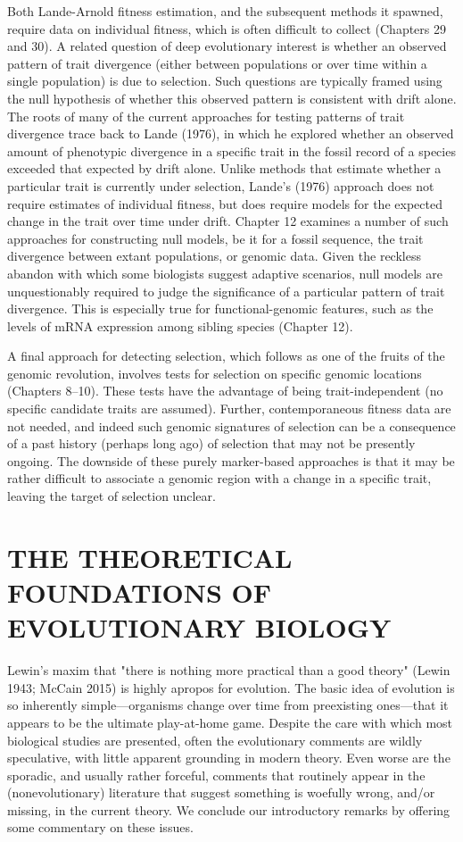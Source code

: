 \documentclass{article}
\begin{document}
Both Lande-Arnold fitness estimation, and the subsequent methods it spawned, require data on individual fitness, which is often difficult to collect (Chapters 29 and 30). A related question of deep evolutionary interest is whether an observed pattern of trait divergence (either between populations or over time within a single population) is due to selection. Such questions are typically framed using the null hypothesis of whether this observed pattern is consistent with drift alone. The roots of many of the current approaches for testing patterns of trait divergence trace back to Lande (1976), in which he explored whether an observed amount of phenotypic divergence in a specific trait in the fossil record of a species exceeded that expected by drift alone. Unlike methods that estimate whether a particular trait is currently under selection, Lande's (1976) approach does not require estimates of individual fitness, but does require models for the expected change in the trait over time under drift. Chapter 12 examines a number of such approaches for constructing null models, be it for a fossil sequence, the trait divergence between extant populations, or genomic data. Given the reckless abandon with which some biologists suggest adaptive scenarios, null models are unquestionably required to judge the significance of a particular pattern of trait divergence. This is especially true for functional-genomic features, such as the levels of mRNA expression among sibling species (Chapter 12).

A final approach for detecting selection, which follows as one of the fruits of the genomic revolution, involves tests for selection on specific genomic locations (Chapters 8–10). These tests have the advantage of being trait-independent (no specific candidate traits are assumed). Further, contemporaneous fitness data are not needed, and indeed such genomic signatures of selection can be a consequence of a past history (perhaps long ago) of selection that may not be presently ongoing. The downside of these purely marker-based approaches is that it may be rather difficult to associate a genomic region with a change in a specific trait, leaving the target of selection unclear.

\section{THE THEORETICAL FOUNDATIONS OF EVOLUTIONARY BIOLOGY}
Lewin's maxim that "there is nothing more practical than a good theory" (Lewin 1943; McCain 2015) is highly apropos for evolution. The basic idea of evolution is so inherently simple—organisms change over time from preexisting ones—that it appears to be the ultimate play-at-home game. Despite the care with which most biological studies are presented, often the evolutionary comments are wildly speculative, with little apparent grounding in modern theory. Even worse are the sporadic, and usually rather forceful, comments that routinely appear in the (nonevolutionary) literature that suggest something is woefully wrong, and/or missing, in the current theory. We conclude our introductory remarks by offering some commentary on these issues.
\end{document}
